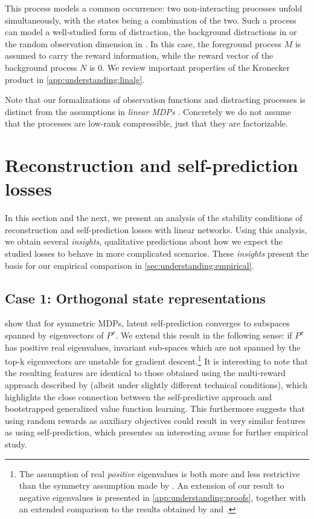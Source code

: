 This process models a common occurrence: two non-interacting processes unfold simultaneously, with the states being a combination of the two.
Such a process can model a well-studied form of distraction, the background distractions in \cite{stone2021thedc} or the random observation dimension in \textcite{nikishin2021control,voelcker2022value}.
In this case, the foreground process $M$ is assumed to carry the reward information, while the reward vector of the background process $N$ is 0.
We review important properties of the Kronecker product in \autoref{app:understanding:linalg}.


Note that our formalizations of observation functions and distracting processes is distinct from the assumptions in \emph{linear MDPs} \parencite{jin2020provably}. Concretely we do not assume that the processes are low-rank compressible, just that they are factorizable.

\section{Reconstruction and self-prediction losses}
\label{sec:understanding:stand_alone_tasks}

In this section and the next, we present an analysis of the stability conditions of reconstruction and self-prediction losses with linear networks.
Using this analysis, we obtain several \emph{insights}, qualitative predictions about how we expect the studied losses to behave in more complicated scenarios.
These \emph{insights} present the basis for our empirical comparison in \autoref{sec:understanding:empirical}.

\subsection{Case 1: Orthogonal state representations}


\cite{tang2022understanding} show that for symmetric MDPs, latent self-prediction converges to subspaces spanned by eigenvectors of $P^\pi$. 
We extend this result in the following sense: if $P^\pi$ has positive real eigenvalues, invariant sub-spaces which are not spanned by the top-k eigenvectors are unstable for gradient descent.\footnote{The assumption of real \emph{positive} eigenvalues is both more and less restrictive than the symmetry assumption made by \textcite{tang2022understanding}. An extension of our result to negative eigenvalues is presented in \autoref{app:understanding:proofs}, together with an extended comparison to the results obtained by \textcite{tang2022understanding} and \textcite{lelan2023bootstrapped}.}
It is interesting to note that the resulting features are identical to those obtained using the multi-reward approach described by \cite{lelan2023bootstrapped} (albeit under slightly different technical conditions), which highlights the close connection between the self-predictive approach and bootstrapped generalized value function learning.
This furthermore suggests that using random rewards as auxiliary objectives \parencite{farebrother2023protovalue} could result in very similar features as using self-prediction, which presentes an interesting avnue for further empirical study.


